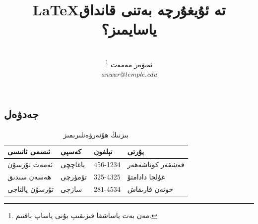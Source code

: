 \documentclass[24]{article}
\begin{document}
\title{\textarabic{\LaTeX  تە ئۇيغۇرچە بەتنى قانداق ياسايمىز؟ }}
\author{
{\em } \\\textarabic{ئەنۋەر مەمەت \footnote{\textarabic{مەن بەت ياساشقا قىزىقىپ بۇنى ياساپ باقتىم.}}}\\
{\em anwar@temple.edu}\\
}


\date{}
\maketitle{}
\thispagestyle{empty}





\begin{Arabic}
\newfontfamily{}
\section{\textarabic{ جەدۋەل }}
\end{Arabic}
\newfontfamily{}

\begin {table}[h]
\caption {\textarabic{بىزنىڭ ھۆنەرۋەنلىرىمىز}} \label{tab:people} 
\begin{center}
\begin{Arabic}
    \begin{tabular}{ | l | l | l | l |}
    \hline
   {ئىسمى ئاتىسى} & كەسپى & تېلفون &  يۇرتى{}  \\ \hline
    ئەمەت تۇرسۇن & ياغاچچى & 456-1234 & قەشقەر كوناشەھەر \\ \hline
    ھەسەن سىدىق & تۆمۈرچى & 325-4325 & غۇلجا دادامتۇ \\ \hline
    تۇرسۇن پالتاجى & سازچى & 281-4534 & خوتەن قارىقاش\\
    \hline
    
    \end{tabular}
    \end{Arabic}
\end{center}
\end{table}
\end{document}
